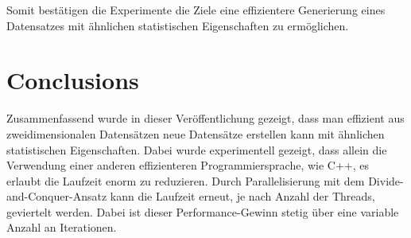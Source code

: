 \documentclass[sigconf]{acmart}
\begin{document}
Somit bestätigen die Experimente die Ziele eine effizientere Generierung eines Datensatzes mit ähnlichen statistischen Eigenschaften zu ermöglichen.   


\section{Conclusions}

Zusammenfassend wurde  in dieser Veröffentlichung gezeigt, dass man effizient aus zweidimensionalen Datensätzen neue Datensätze erstellen kann mit ähnlichen statistischen Eigenschaften. Dabei wurde experimentell gezeigt, dass allein die Verwendung einer anderen effizienteren Programmiersprache, wie C++, es erlaubt die Laufzeit enorm zu reduzieren. Durch Parallelisierung mit dem Divide-and-Conquer-Ansatz kann die Laufzeit erneut, je nach Anzahl der Threads, geviertelt werden. Dabei ist dieser Performance-Gewinn stetig über eine variable Anzahl an Iterationen. 



\end{document}
